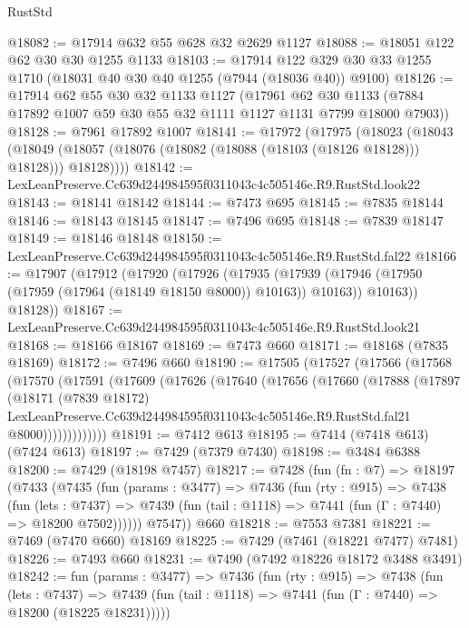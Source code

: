 \begin{lexlean}{RustStd}
\begin{coremodule}
@18082 := @17914 @632 @55 @628 @32 @2629 @1127
@18088 := @18051 @122 @62 @30 @30 @1255 @1133
@18103 := @17914 @122 @329 @30 @33 @1255 @1710 (@18031 @40 @30 @40 @1255 (@7944 (@18036 @40)) @9100)
@18126 := @17914
    @62
    @55
    @30
    @32
    @1133
    @1127
    (@17961 @62 @30 @1133 (@7884 @17892 @1007 @59 @30 @55 @32 @1111 @1127 @1131 @7799 @18000 @7903))
@18128 := @7961 @17892 @1007
@18141 := @17972
    (@17975
      (@18023
        (@18043
          (@18049 (@18057 (@18076 (@18082 (@18088 (@18103 (@18126 @18128))) @18128))) @18128))))
@18142 := LexLeanPreserve.Cc639d244984595f0311043c4c505146e.R9.RustStd.look22
@18143 := @18141 @18142
@18144 := @7473 @695
@18145 := @7835 @18144
@18146 := @18143 @18145
@18147 := @7496 @695
@18148 := @7839 @18147
@18149 := @18146 @18148
@18150 := LexLeanPreserve.Cc639d244984595f0311043c4c505146e.R9.RustStd.fal22
@18166 := @17907
    (@17912
      (@17920
        (@17926
          (@17935
            (@17939 (@17946 (@17950 (@17959 (@17964 (@18149 @18150 @8000)) @10163)) @10163))
            @10163))
        @18128))
@18167 := LexLeanPreserve.Cc639d244984595f0311043c4c505146e.R9.RustStd.look21
@18168 := @18166 @18167
@18169 := @7473 @660
@18171 := @18168 (@7835 @18169)
@18172 := @7496 @660
@18190 := @17505
    (@17527
      (@17566
        (@17568
          (@17570
            (@17591
              (@17609
                (@17626
                  (@17640
                    (@17656
                      (@17660
                        (@17888
                          (@17897
                            (@18171
                              (@7839 @18172)
                              LexLeanPreserve.Cc639d244984595f0311043c4c505146e.R9.RustStd.fal21
                              @8000)))))))))))))
@18191 := @7412 @613
@18195 := @7414 (@7418 @613) (@7424 @613)
@18197 := @7429 (@7379 @7430)
@18198 := @3484 @6388
@18200 := @7429 (@18198 @7457)
@18217 := @7428
    (fun (fn : @7) =>
    @18197
      (@7433
        (@7435
          (fun (params : @3477) =>
          @7436
            (fun (rty : @915) =>
            @7438
              (fun (lets : @7437) =>
              @7439 (fun (tail : @1118) => @7441 (fun (Γ : @7440) => @18200 @7502))))))
        @7547))
    @660
@18218 := @7553 @7381
@18221 := @7469 (@7470 @660) @18169
@18225 := @7429 (@7461 (@18221 @7477) @7481)
@18226 := @7493 @660
@18231 := @7490 (@7492 @18226 @18172 @3488 @3491)
@18242 := fun (params : @3477) =>
  @7436
    (fun (rty : @915) =>
    @7438
      (fun (lets : @7437) =>
      @7439 (fun (tail : @1118) => @7441 (fun (Γ : @7440) => @18200 (@18225 @18231)))))

\end{coremodule}
\end{lexlean}
